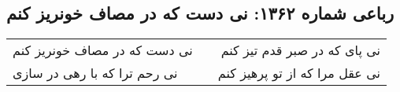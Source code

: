\begin{center}
\section*{رباعی شماره ۱۳۶۲: نی دست که در مصاف خونریز کنم}
\label{sec:1362}
\begin{longtable}{l p{0.5cm} r}
نی دست که در مصاف خونریز کنم
&&
نی پای که در صبر قدم تیز کنم
\\
نی رحم ترا که با رهی در سازی
&&
نی عقل مرا که از تو پرهیز کنم
\\
\end{longtable}
\end{center}
